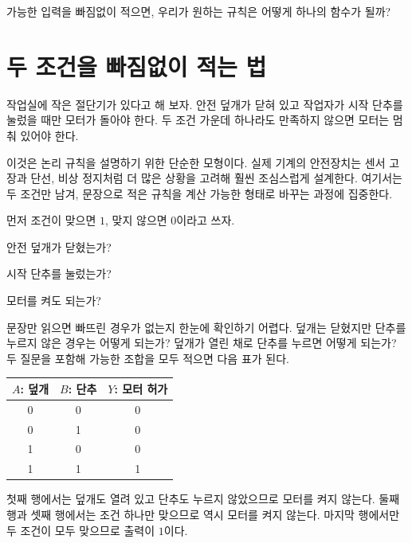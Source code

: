 \begin{objectivebox}
가능한 입력을 빠짐없이 적으면, 우리가 원하는 규칙은 어떻게 하나의 함수가 될까?
\end{objectivebox}

\section{두 조건을 빠짐없이 적는 법}

작업실에 작은 절단기가 있다고 해 보자. 안전 덮개가 닫혀 있고 작업자가 시작 단추를 눌렀을 때만 모터가 돌아야 한다. 두 조건 가운데 하나라도 만족하지 않으면 모터는 멈춰 있어야 한다.

이것은 논리 규칙을 설명하기 위한 단순한 모형이다. 실제 기계의 안전장치는 센서 고장과 단선, 비상 정지처럼 더 많은 상황을 고려해 훨씬 조심스럽게 설계한다. 여기서는 두 조건만 남겨, 문장으로 적은 규칙을 계산 가능한 형태로 바꾸는 과정에 집중한다.

먼저 조건이 맞으면 \(1\), 맞지 않으면 \(0\)이라고 쓰자.

\begin{description}[style=nextline,leftmargin=2.5em,font=\sffamily\bfseries]
  \item[입력 \(A\)] 안전 덮개가 닫혔는가?
  \item[입력 \(B\)] 시작 단추를 눌렀는가?
  \item[출력 \(Y\)] 모터를 켜도 되는가?
\end{description}

문장만 읽으면 빠뜨린 경우가 없는지 한눈에 확인하기 어렵다. 덮개는 닫혔지만 단추를 누르지 않은 경우는 어떻게 되는가? 덮개가 열린 채로 단추를 누르면 어떻게 되는가? 두 질문을 포함해 가능한 조합을 모두 적으면 다음 표가 된다.

\begin{center}
\small
\begin{tabular}{ccc}
\toprule
\sffamily\bfseries \(A\): 덮개 & \sffamily\bfseries \(B\): 단추 & \sffamily\bfseries \(Y\): 모터 허가 \\
\midrule
0 & 0 & 0 \\
0 & 1 & 0 \\
1 & 0 & 0 \\
1 & 1 & 1 \\
\bottomrule
\end{tabular}
\end{center}

첫째 행에서는 덮개도 열려 있고 단추도 누르지 않았으므로 모터를 켜지 않는다. 둘째 행과 셋째 행에서는 조건 하나만 맞으므로 역시 모터를 켜지 않는다. 마지막 행에서만 두 조건이 모두 맞으므로 출력이 \(1\)이다.

